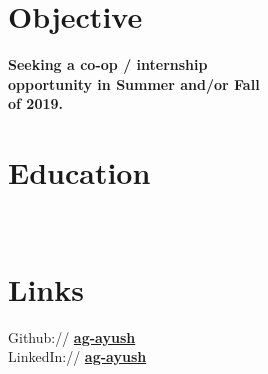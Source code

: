 \documentclass[]{deedy-resume-openfont}
\begin{document}
%
%
\lastupdated

%
%

%
%

\begin{minipage}[t]{0.30\textwidth}


\section{Objective}
\textbf{Seeking a co-op / internship \\
opportunity in Summer and/or Fall \\
of 2019.}


\section{Education}

 \\


\section{Links}
Github:// \href{https://github.com/ayush}{\bf ag-ayush} \\
LinkedIn://  \href{https://www.linkedin.com/in/ag-ayush}{\bf ag-ayush} \\



\end{minipage}
\end{document}
